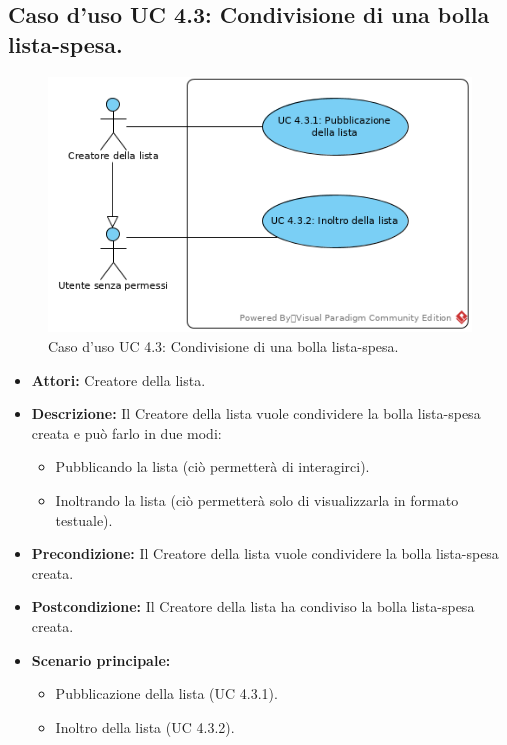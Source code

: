 \subsection{Caso d'uso UC 4.3: Condivisione di una bolla lista-spesa.}
\label{Caso d'uso UC 4.3: Condivisione di una bolla lista-spesa.}
\begin{figure}[ht]
	\centering
	\includegraphics[scale=0.60]{Usecases/img/UC4.3.png}
	\caption{Caso d'uso UC 4.3: Condivisione di una bolla lista-spesa.}
\end{figure}

\FloatBarrier
\begin{itemize}
\item \textbf{Attori:} Creatore della lista.
\item \textbf{Descrizione:} Il Creatore della lista vuole condividere la bolla lista-spesa creata e può farlo in due modi:
\begin{itemize}
\item{Pubblicando la lista (ciò permetterà di interagirci).}
\item{Inoltrando la lista (ciò permetterà solo di visualizzarla in formato testuale).}
\end{itemize}
\item \textbf{Precondizione:} Il Creatore della lista vuole condividere la bolla lista-spesa creata. 
\item \textbf{Postcondizione:} Il Creatore della lista ha condiviso la bolla lista-spesa creata.
\item \textbf{Scenario principale:}
	\begin{itemize}
	\item{Pubblicazione della lista (UC 4.3.1).}
	\item{Inoltro della lista (UC 4.3.2).}
	\end{itemize}
\end{itemize}